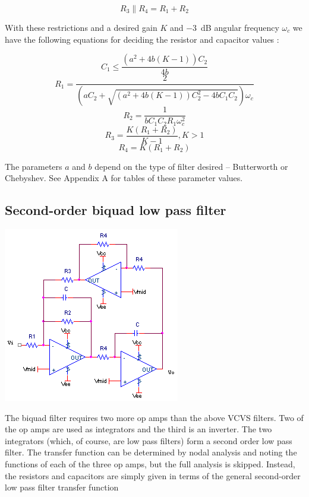 \begin{equation}
R_3 \parallel R_4 = R_1 + R_2
\end{equation}

With these restrictions and a desired gain $K$ and \SI{-3}{\dB} angular frequency $\omega_{c}$ we have the following equations for deciding the resistor and capacitor values \autocite[118-119]{op-amp-circuits-johnson}:

\begin{equation}
C_1 \leq \frac{(a^2+4b(K-1))C_2}{4b}
\end{equation}
\begin{equation}
R_1 = \frac{2}{(aC_2+\sqrt{(a^2+4b(K-1))C_2^2 - 4b C_1 C_2})\omega_{c}}
\end{equation}
\begin{equation}
R_2 = \frac{1}{bC_1 C_2 R_1\omega_{c}^2}
\end{equation}
\begin{equation}
R_3 = \frac{K(R_1 + R_2)}{K-1}, K > 1
\end{equation}
\begin{equation}
R_4 = K(R_1 + R_2)
\end{equation}

The parameters $a$ and $b$ depend on the type of filter desired -- Butterworth or Chebyshev. See Appendix A for tables of these parameter values.

\subsection{Second-order biquad low pass filter}
\begin{center}
	\includegraphics{schematics/2ndorderbiquadLPfilter.PNG}
\end{center}
The biquad filter requires two more op amps than the above VCVS filters. Two of the op amps are used as integrators and the third is an inverter. The two integrators (which, of course, are low pass filters) form a second order low pass filter. The transfer function can be determined by nodal analysis and noting the functions of each of the three op amps, but the full analysis is skipped. Instead, the resistors and capacitors are simply given in terms of the general second-order low pass filter transfer function

